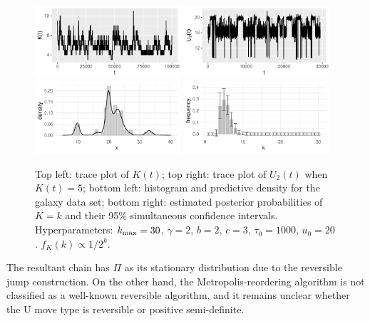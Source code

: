 \documentclass[12pt]{article}
\begin{document}
\begin{figure} 
	\begin{center}
		\includegraphics[width=0.48\textwidth]{mixturek} \; \includegraphics[width=0.48\textwidth]{mixtureu} \\
		\includegraphics[width=0.48\textwidth]{mixturehistogram} \;
		\includegraphics[width=0.48\textwidth]{mixture.intervals}
		\caption{Top left: trace plot of $K(t)$; top right: trace plot of $U_2(t)$ when $K(t) = 5$;
			bottom left: histogram and predictive density for the galaxy data set; 
			bottom right: estimated posterior probabilities of $K = k$ and their 95\% simultaneous confidence intervals.
			Hyperparameters: $k_{\scriptsize\mbox{max}} = 30$, $\gamma = 2$, $b = 2$, $c = 3$, $\tau_0 = 1000$, $u_0 = 20$.
			$f_K(k) \propto 1/2^k$. 
		} \label{fig:galaxy}
	\end{center}
\end{figure}


The resultant chain has $\Pi$ as its stationary distribution due to the reversible jump construction.
On the other hand, the Metropolis-reordering algorithm is not classified as a well-known reversible algorithm, and it remains unclear whether the U move type is reversible or positive semi-definite.
\end{document}
